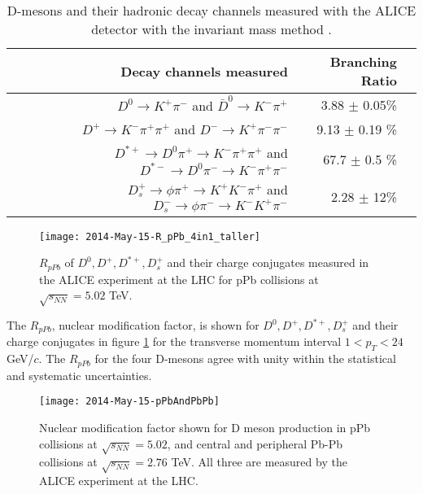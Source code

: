\begin{table}[h]
  \begin{center}
    \caption{D-mesons and their hadronic decay channels measured with the ALICE detector with the invariant mass method \cite{Abelev:2014hha}.}
    \label{tab:InvMassHadronicDecays}
    \begin{tabular}{|r|r|l|}
    \hline
    Decay channels measured & Branching Ratio\\
    \hline
    \rule{0pt}{2.2ex} \rule[-1.1ex]{0pt}{0pt}  $D^{0} \to K^{+} \pi^{-}$ and $\bar D^{0} \to K^{-} \pi^{+}$ & 3.88 $\pm$ 0.05\% \\
    \hline
    \rule{0pt}{2.2ex} $D^{+} \to K^{-} \pi ^{+} \pi ^{+}$ and $D^{-} \to K^{+} \pi ^{-} \pi ^{-}$ & 9.13 $\pm$ 0.19 \% \\
    \hline
   \rule{0pt}{2.2ex} $D^{\ast +} \to D^{0} \pi^{+} \to K^{-} \pi ^{+} \pi ^{+}$ and $D^{\ast -}  \to D^{0} \pi^{-} \to K^{-} \pi ^{+} \pi ^{-}$ & 67.7 $\pm$ 0.5 \%\\
   \hline
   \rule{0pt}{2.2ex} $D^{+}_{s} \to \phi \pi^{+} \to K^{+} K^{-} \pi ^{+} $ and $D^{-}_{s} \to \phi \pi^{-} \to K^{-} K^{+} \pi ^{-} $& 2.28 $\pm$ 12\%\\
   \hline
    \end{tabular}
  \end{center}
\end{table}


\begin{figure}[h]
  \centering
  \texttt{[image: 2014-May-15-R\_pPb\_4in1\_taller]}\\
  \caption{$R_{pPb}$ of $D^{0}, D^{+}, D^{\ast +}, D^{+}_{s}$ and their charge conjugates measured \cite{Abelev:2014hha} in the ALICE experiment at the LHC for pPb collisions at $\sqrt{s_{NN}} = 5.02$ TeV.}\label{fig:2014-May-15-R_pPb_4in1_taller}
\end{figure}

The $R_{pPb}$, nuclear modification factor, is shown for $D^{0}, D^{+}, D^{\ast +}, D^{+}_{s}$ and their charge conjugates in figure \ref{fig:2014-May-15-R_pPb_4in1_taller} \cite{Abelev:2014hha} for the transverse momentum interval $1 < p_{T} < 24$ GeV/$c$. The $R_{pPb}$ for the four D-mesons agree with unity within the statistical and systematic uncertainties. 

\begin{figure}[h]
  \centering
  \texttt{[image: 2014-May-15-pPbAndPbPb]}\\
  \caption{Nuclear modification factor shown for D meson production in pPb collisions at $\sqrt{s_{NN}} = 5.02$, and central and peripheral Pb-Pb collisions at $\sqrt{s_{NN}}=2.76$ TeV. All three are measured \cite{Abelev:2014hha} by the ALICE experiment at the LHC.}\label{fig:2014-May-15-pPbAndPbPb}
\end{figure}

